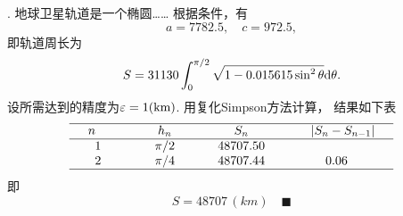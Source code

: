 \vspace{1cm}
\par{}. 地球卫星轨道是一个椭圆……
\ans
  根据条件，有
  \[
    a = 7782.5,\quad c = 972.5,
  \]
  即轨道周长为
  \[
    S = 31130 \int_0^{\pi/2}\sqrt{1-0.015615\sin^2\theta}\mathrm{d}\theta.
  \]
  设所需达到的精度为$\varepsilon = 1(\text{km})$. 用复化Simpson方法计算，
  结果如下表
  \[\begin{array}{ c c c c}
    \hline
    \quad n\qquad & \qquad h_n\qquad & \qquad S_n\qquad &\qquad |S_n - S_{n-1}| \quad\\ \hline
    1 & \pi/2 & 48707.50  & \\
    2 & \pi/4 & 48707.44  & 0.06 \\ \hline
  \end{array}\]
  即
  \[
    S = 48707\,(km)\quad\blacksquare
  \]



